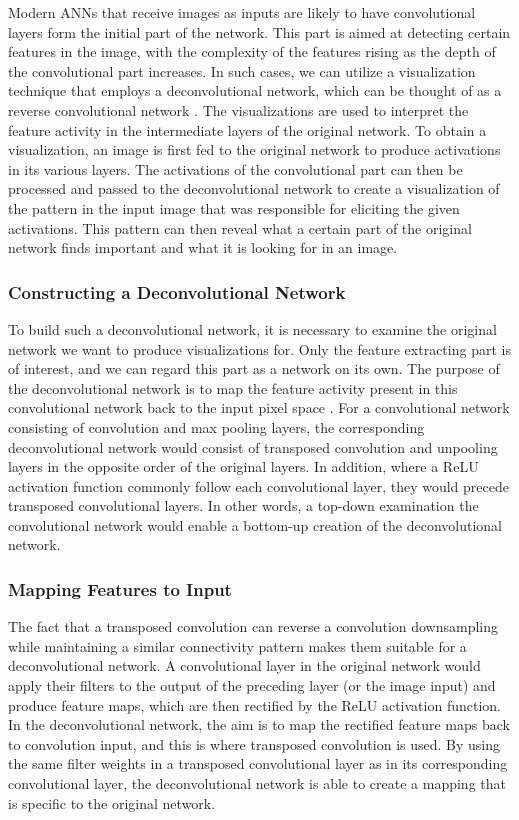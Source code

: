 Modern ANNs that receive images as inputs are likely to have convolutional layers form the initial part of the network. This part is aimed at detecting certain features in the image, with the complexity of the features rising as the depth of the convolutional part increases. In such cases, we can utilize a visualization technique that employs a deconvolutional network, which can be thought of as a reverse convolutional network \cite{deconv_net}. The visualizations are used to interpret the feature activity in the intermediate layers of the original network. To obtain a visualization, an image is first fed to the original network to produce activations in its various layers. The activations of the convolutional part can then be processed and passed to the deconvolutional network to create a visualization of the pattern in the input image that was responsible for eliciting the given activations. This pattern can then reveal what a certain part of the original network finds important and what it is looking for in an image. 
\subsubsection{Constructing a Deconvolutional Network}

To build such a deconvolutional network, it is necessary to examine the original network we want to produce visualizations for. Only the feature extracting part is of interest, and we can regard this part as a network on its own. The purpose of the deconvolutional network is to map the feature activity present in this convolutional network back to the input pixel space \cite{deconv_vis}. For a convolutional network consisting of convolution and max pooling layers, the corresponding deconvolutional network would consist of transposed convolution and unpooling layers in the opposite order of the original layers. In addition, where a ReLU activation function commonly follow each convolutional layer, they would precede transposed convolutional layers. In other words, a top-down examination the convolutional network would enable a bottom-up creation of the deconvolutional network. 

\subsubsection{Mapping Features to Input}

The fact that a transposed convolution can reverse a convolution downsampling while maintaining a similar connectivity pattern makes them suitable for a deconvolutional network. A convolutional layer in the original network would apply their filters to the output of the preceding layer (or the image input) and produce feature maps, which are then rectified by the ReLU activation function. In the deconvolutional network, the aim is to map the rectified feature maps back to convolution input, and this is where transposed convolution is used. By using the same filter weights in a transposed convolutional layer as in its corresponding convolutional layer, the deconvolutional network is able to create a mapping that is specific to the original network. \\


